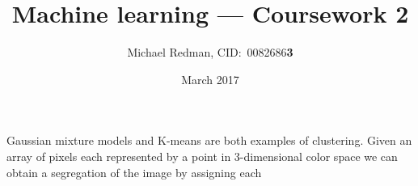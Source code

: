 \documentclass[a4paper]{article}
\begin{document}
\title{Machine learning --- Coursework 2}
\author{Michael Redman, CID:\ 0082686\textbf{3}}
\date{March 2017}

\maketitle

Gaussian mixture models and K-means are both examples of clustering. Given an array of pixels each represented by a point in 3-dimensional color space we can obtain a segregation of the image by assigning each  
\end{document}
